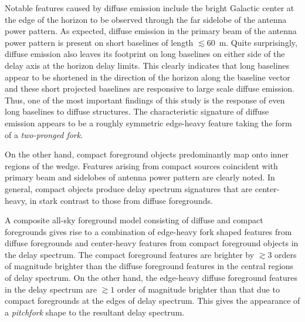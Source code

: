 \documentclass[preprint2,iop,numberedappendix]{emulateapj}
\begin{document}
Notable features caused by diffuse emission include the bright Galactic center at the edge of the horizon to be observed through the far sidelobe of the antenna power pattern. As expected, diffuse emission in the primary beam of the antenna power pattern is present on short baselines of length $\lesssim 60$~m. Quite surprisingly, diffuse emission also leaves its footprint on long baselines on either side of the delay axis at the horizon delay limits. This clearly indicates that long baselines appear to be shortened in the direction of the horizon along the baseline vector and these short projected baselines are responsive to large scale diffuse emission. Thus, one of the most important findings of this study is the response of even long baselines to diffuse structures. The characteristic signature of diffuse emission appears to be a roughly symmetric edge-heavy feature taking the form of a {\it two-pronged fork}. 

On the other hand, compact foreground objects predominantly map onto inner regions of the wedge. Features arising from compact sources coincident with primary beam and sidelobes of antenna power pattern are clearly noted. In general, compact objects produce delay spectrum signatures that are center-heavy, in stark contrast to those from diffuse foregrounds.

A composite all-sky foreground model consisting of diffuse and compact foregrounds gives rise to a combination of edge-heavy fork shaped features from diffuse foregrounds and center-heavy features from compact foreground objects in the delay spectrum. The compact foreground features are brighter by $\gtrsim 3$ orders of magnitude brighter than the diffuse foreground features in the central regions of delay spectrum. On the other hand, the edge-heavy diffuse foreground features in the delay spectrum are $\gtrsim 1$ order of magnitude brighter than that due to compact foregrounds at the edges of delay spectrum. This gives the appearance of a {\it pitchfork} shape to the resultant delay spectrum. 

\acknowledgments
\end{document}
